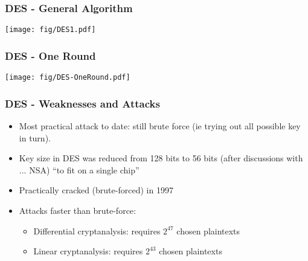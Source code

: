 \documentclass[
hyperref={pdfpagelabels=false}
,xcolor=table
]
{beamer}
\begin{document}
 


\begin{frame}
  \frametitle{DES - General Algorithm}
  \begin{center}
    \texttt{[image: fig/DES1.pdf]}
  \end{center} 
  
\end{frame}

\begin{frame}
  \frametitle{DES - One Round}
  \begin{center}
    \texttt{[image: fig/DES-OneRound.pdf]}
  \end{center} 

\end{frame}


\begin{frame}
  \frametitle{DES - Weaknesses and Attacks}

  \begin{itemize}
  \item Most practical attack to date: still brute force (ie trying out all possible key in turn).
  \item Key size in DES was reduced from 128 bits to 56 bits (after discussions with ... NSA) ``to fit on a single chip''
  \item Practically cracked (brute-forced) in 1997
  \item Attacks faster than brute-force:
    \begin{itemize}
    \item Differential cryptanalysis: requires $2^{47}$ chosen plaintexts
    \item Linear cryptanalysis: requires $2^{43}$ chosen plaintexts
    \end{itemize}
  \end{itemize}
\end{frame}
\end{document}
